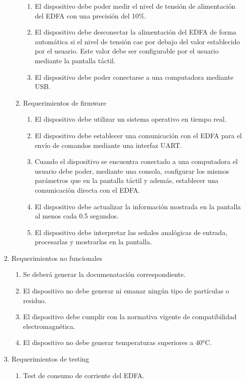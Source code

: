 \documentclass[
11pt, %
codirector, %
]{charter}
\begin{document}
\begin{enumerate}
\begin{enumerate}
\begin{enumerate}[label*=\arabic*.]
					\item El dispositivo debe poder medir el nivel de tensión de alimentación del EDFA con una precisión del 10\%.
					\item El dispositivo debe desconectar la alimentación del EDFA de forma automática si el nivel de tensión cae por debajo del valor establecido por el usuario. Este valor debe ser configurable por el usuario mediante la pantalla táctil.
					\item El dispositivo debe poder conectarse a una computadora mediante USB.
				\end{enumerate}
			\item Requerimientos de firmware
				\begin{enumerate}[label*=\arabic*.]
					\item El dispositivo debe utilizar un sistema operativo en tiempo real.
					\item El dispositivo debe establecer una comunicación con el EDFA para el envío de comandos mediante una interfaz UART.
					\item Cuando el dispositivo se encuentra conectado a una computadora el usuario debe poder, mediante una consola, configurar los mismos parámetros que en la pantalla táctil y además, establecer una comunicación directa con el EDFA.
					\item El dispositivo debe actualizar la información mostrada en la pantalla al menos cada 0.5 segundos.
					\item El dispositivo debe interpretar las señales analógicas de entrada, procesarlas y mostrarlas en la pantalla.
				\end{enumerate}
		\end{enumerate}
	\item Requerimientos no funcionales
		\begin{enumerate}
			\item Se deberá generar la documenatación correspondiente.
			\item El dispositivo no debe generar ni emanar ningún tipo de partículas o residuo.
			\item El dispositivo debe cumplir con la normativa vigente de compatibilidad electromagnética.
			\item El dispositivo no debe generar temperaturas superiores a 40°C.
		\end{enumerate}
	\item Requerimientos de testing
		\begin{enumerate}
			\item Test de consumo de corriente del EDFA.

\end{enumerate}
\end{enumerate}
\end{document}
